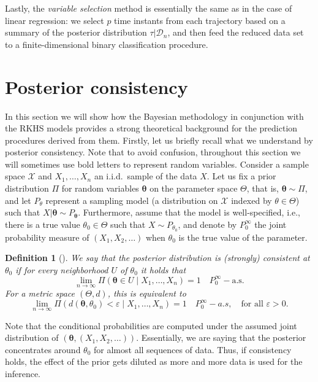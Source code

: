 \documentclass{article}
\numberwithin{equation}{section}
\theoremstyle{plain}
\newtheorem{definition}{Definition}[section]
\renewcommand{\epsilon}{\varepsilon}
\begin{document}
Lastly, the \textit{variable selection} method is essentially the same as in the case of linear regression: we select \(p\) time instants from each trajectory based on a summary of the posterior distribution \(\tau | \mathcal D_n\), and then feed the reduced data set to a finite-dimensional binary classification procedure.

\section{Posterior consistency}\label{sec:consistency}

In this section we will show how the Bayesian methodology in conjunction with the RKHS models provides a strong theoretical background for the prediction procedures derived from them. Firstly, let us briefly recall what we understand by posterior consistency. Note that to avoid confusion, throughout this section we will sometimes use bold letters to represent random variables. Consider a sample space \(\mathcal X\) and \(X_1,\dots, X_n\) an i.i.d.\ sample of the data \(X\). Let us fix a prior distribution \(\Pi\) for random variables \(\bm\theta\) on the parameter space \(\Theta\), that is, \(\bm\theta \sim \Pi\), and let \(P_\theta\) represent a sampling model (a distribution  on \(\mathcal X\) indexed by \(\theta \in \Theta\)) such that \(X | \bm \theta \sim P_{\bm \theta}\). Furthermore, assume that the model is well-specified, i.e., there is a true value \(\theta_{0}\in\Theta\) such that \(X \sim P_{\theta_0}\), and denote by \(P_0^\infty\) the joint probability measure of \((X_1, X_2, \dots)\) when \(\theta_0\) is the true value of the parameter.

\begin{definition}[\citealp{ghosh2003bayesian}]
  We say that the posterior distribution is (strongly) consistent at \(\theta_0\) if for every neighborhood \(U\) of \(\theta_0\) it holds that
  \[
    \lim_{n\to\infty} \Pi(\bm\theta \in U \mid X_1, \dots,X_n) =1 \quad P_0^\infty-\text{a.s.}
  \]
  For a metric space \((\Theta, d)\), this is equivalent to
  \[
    \lim_{n\to\infty} \Pi(d(\bm \theta, \theta_0) < \epsilon \mid X_1, \dots, X_n) = 1 \quad P_0^\infty-a.s, \quad \text{for all } \epsilon > 0.
  \]
\end{definition}

Note that the conditional probabilities are computed under the assumed joint distribution of \((\bm \theta, (X_1, X_2,\dots))\). Essentially, we are saying that the posterior concentrates around \(\theta_0\) for almost all sequences of data. Thus, if consistency holds, the effect of the prior gets diluted as more and more data is used for the inference.
\end{document}
